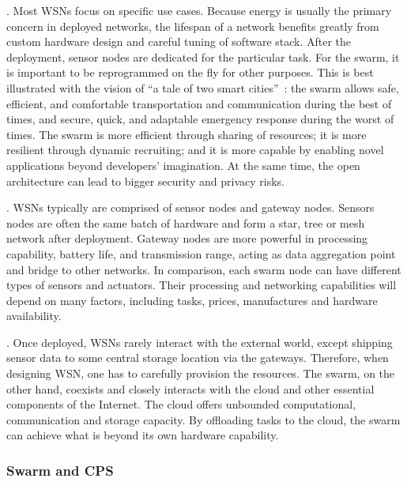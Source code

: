 . Most WSNs
focus on specific use cases. Because energy is usually the primary concern in
deployed networks, the lifespan of a network benefits greatly from custom
hardware design and careful tuning of software stack. After the deployment,
sensor nodes are dedicated for the particular task. For the swarm, it is
important to be reprogrammed on the fly for other purposes. This is best
illustrated with the vision of ``a tale of two smart
cities''~\cite{lee2012terraswarm}: the swarm allows safe, efficient, and
comfortable transportation and communication during the best of times, and
secure, quick, and adaptable emergency response during the worst of times. The
swarm is more efficient through sharing of resources; it is more resilient
through dynamic recruiting; and it is more capable by enabling novel
applications beyond developers' imagination. At the same time, the open
architecture can lead to bigger security and privacy risks.

. WSNs
typically are comprised of sensor nodes and gateway nodes. Sensors nodes are
often the same batch of hardware and form a star, tree or mesh network after
deployment. Gateway nodes are more powerful in processing capability, battery
life, and transmission range, acting as data aggregation point and bridge to
other networks. In comparison, each swarm node can have different types of
sensors and actuators. Their processing and networking capabilities will depend
on many factors, including tasks, prices, manufactures and hardware
availability.

. Once deployed, WSNs rarely interact with the external world,
except shipping sensor data to some central storage location via the
gateways. Therefore, when designing WSN, one has to carefully provision the
resources. The swarm, on the other hand, coexists and closely interacts with the
cloud and other essential components of the Internet. The cloud offers unbounded
computational, communication and storage capacity. By offloading tasks to the
cloud, the swarm can achieve what is beyond its own hardware capability.

\subsubsection{Swarm and CPS}
\label{sec:swarm-cps}

